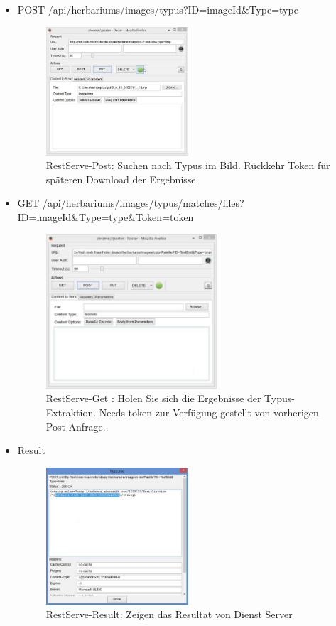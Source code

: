 \documentclass[10pt,a4paper]{report}
\begin{document}
\begin{itemize}
\item POST /api/herbariums/images/typus?ID={imageId}\&Type={type}\\
\begin{figure}[htbp] 
	\centering
	\includegraphics[width=0.5\textwidth]{RestServe1.jpg}
	\caption{RestServe-Post: Suchen nach Typus im Bild. Rückkehr Token für späteren Download der Ergebnisse.}
	\label{fig:Bild 3}
\end{figure}
\item GET /api/herbariums/images/typus/matches/files?ID={imageId}\&Type={type}\&Token={token}\\
\begin{figure}[htbp] 
	\centering
	\includegraphics[width=0.6\textwidth]{Server2.jpg}
	\caption{RestServe-Get :
	Holen Sie sich die Ergebnisse der Typus-Extraktion. Needs token zur Verfügung gestellt von vorherigen Post Anfrage..}
	\label{fig:Bild 4}
\end{figure}
\item Result \\
\begin{figure}[htbp] 
	\centering
	\includegraphics[width=0.5\textwidth]{Server3.jpg}
	\caption{RestServe-Result: Zeigen das Resultat von Dienst Server}
	\label{fig:Bild 5}
\end{figure}
\end{itemize}
\end{document}
